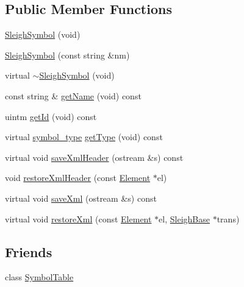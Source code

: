 \subsection*{Public Member Functions}
\begin{DoxyCompactItemize}
\item 
\mbox{\hyperlink{class_sleigh_symbol_a15a720792ff4ad0940dd673c3215f037}{Sleigh\+Symbol}} (void)
\item 
\mbox{\hyperlink{class_sleigh_symbol_ad4f8681f0822c11b46633a7202ebd0e9}{Sleigh\+Symbol}} (const string \&nm)
\item 
virtual \mbox{\hyperlink{class_sleigh_symbol_a68ec4af12e1374776ca3d6552e5e5680}{$\sim$\+Sleigh\+Symbol}} (void)
\item 
const string \& \mbox{\hyperlink{class_sleigh_symbol_a0a833d55302c4e1cfd77a7726b72a04a}{get\+Name}} (void) const
\item 
uintm \mbox{\hyperlink{class_sleigh_symbol_a48557f9371e94c4940c682720e9c81c1}{get\+Id}} (void) const
\item 
virtual \mbox{\hyperlink{class_sleigh_symbol_aba70f7f332fd63488c5ec4bd7807db41}{symbol\+\_\+type}} \mbox{\hyperlink{class_sleigh_symbol_a2f6e5903e461084c29f95ea024883950}{get\+Type}} (void) const
\item 
virtual void \mbox{\hyperlink{class_sleigh_symbol_ac501be7c584bc0568c29fb95910962e9}{save\+Xml\+Header}} (ostream \&s) const
\item 
void \mbox{\hyperlink{class_sleigh_symbol_addbcd83dac8157f1af67b21e560f4607}{restore\+Xml\+Header}} (const \mbox{\hyperlink{class_element}{Element}} $\ast$el)
\item 
virtual void \mbox{\hyperlink{class_sleigh_symbol_a83c9a32d16419d2277c5b9d542e1cf13}{save\+Xml}} (ostream \&s) const
\item 
virtual void \mbox{\hyperlink{class_sleigh_symbol_accaec1696f99366fb0e089a7fceb56a3}{restore\+Xml}} (const \mbox{\hyperlink{class_element}{Element}} $\ast$el, \mbox{\hyperlink{class_sleigh_base}{Sleigh\+Base}} $\ast$trans)
\end{DoxyCompactItemize}
\subsection*{Friends}
\begin{DoxyCompactItemize}
\item 
class \mbox{\hyperlink{class_sleigh_symbol_ac1b80bc52166901e909169b2657de45f}{Symbol\+Table}}
\end{DoxyCompactItemize}


